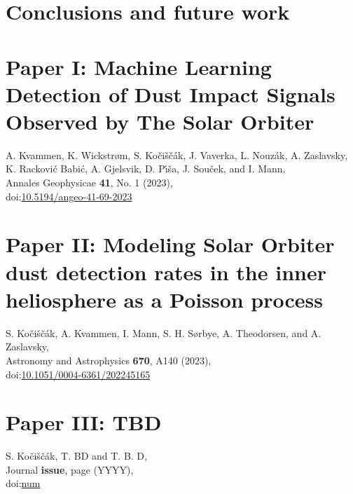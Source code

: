 \documentclass[11pt,twoside,openright]{book}
\begin{document}
\chapter{Conclusions and future work}\label{ch:conclusion}





\backmatter



\chapter{Paper I: Machine Learning Detection of Dust Impact Signals Observed by The Solar Orbiter}
A. Kvammen, K. Wickstr{\o}m, S. Ko{\v{c}}i{\v{s}}{\v{c}}{\'a}k, J. Vaverka, L. Nouz{\'a}k, A. Zaslavsky, K. Rackovi{\'c} Babi{\'c}, A. Gjelsvik, D. P{\'\i}{\v{s}}a, J. Sou{\v{c}}ek, and I. Mann, \\
Annales Geophysicae {\bf 41}, No. 1 (2023),\\
doi:\href{https://doi.org/10.5194/angeo-41-69-2023}{10.5194/angeo-41-69-2023}
\newpage\null\newpage


\chapter{Paper II: Modeling Solar Orbiter dust detection rates in the inner heliosphere as a Poisson process}
S. Ko{\v{c}}i{\v{s}}{\v{c}}{\'a}k, A. Kvammen, I. Mann, S. H. S{\o}rbye, A. Theodorsen, and A. Zaslavsky,\\
Astronomy and Astrophysics {\bf 670}, A140 (2023),\\
doi:\href{https://doi.org/10.1051/0004-6361/202245165}{10.1051/0004-6361/202245165}
\newpage\null\newpage



\chapter{Paper III: TBD}
S. Ko{\v{c}}i{\v{s}}{\v{c}}{\'a}k, T. BD and T. B. D,\\
Journal {\bf issue}, page (YYYY),\\
doi:\href{https://doi.org/num}{num}
\newpage\null\newpage
% 
\end{document}
